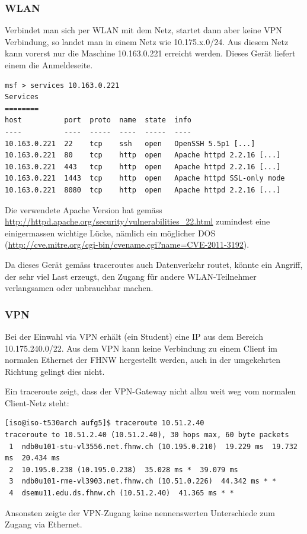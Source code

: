 \documentclass[11pt,a4paper]{scrartcl}
\begin{document}
\subsubsection{WLAN}
Verbindet man sich per WLAN mit dem Netz, startet dann aber keine VPN Verbindung, so landet man in einem Netz wie 10.175.x.0/24. Aus diesem Netz kann vorerst nur die Maschine 10.163.0.221 erreicht werden. Dieses Gerät liefert einem die Anmeldeseite.
\begin{lstlisting}
msf > services 10.163.0.221
Services
========
host          port  proto  name  state  info
----          ----  -----  ----  -----  ----
10.163.0.221  22    tcp    ssh   open   OpenSSH 5.5p1 [...]
10.163.0.221  80    tcp    http  open   Apache httpd 2.2.16 [...]
10.163.0.221  443   tcp    http  open   Apache httpd 2.2.16 [...]
10.163.0.221  1443  tcp    http  open   Apache httpd SSL-only mode 
10.163.0.221  8080  tcp    http  open   Apache httpd 2.2.16 [...]
\end{lstlisting}
Die verwendete Apache Version hat gemäss \url{http://httpd.apache.org/security/vulnerabilities_22.html} zumindest eine einigermassen wichtige Lücke, nämlich ein möglicher DOS (\url{http://cve.mitre.org/cgi-bin/cvename.cgi?name=CVE-2011-3192}).

Da dieses Gerät gemäss traceroutes auch Datenverkehr routet, könnte ein Angriff, der sehr viel Last erzeugt, den Zugang für andere WLAN-Teilnehmer verlangsamen oder unbrauchbar machen.

\subsubsection{VPN}
Bei der Einwahl via VPN erhält (ein Student) eine IP aus dem Bereich 10.175.240.0/22. Aus dem VPN kann keine Verbindung zu einem Client im normalen Ethernet der FHNW hergestellt werden, auch in der umgekehrten Richtung gelingt dies nicht.

Ein traceroute zeigt, dass der VPN-Gateway nicht allzu weit weg vom normalen Client-Netz steht:
\begin{lstlisting}
[iso@iso-t530arch aufg5]$ traceroute 10.51.2.40
traceroute to 10.51.2.40 (10.51.2.40), 30 hops max, 60 byte packets
 1  ndb0u101-stu-vl3556.net.fhnw.ch (10.195.0.210)  19.229 ms  19.732 ms  20.434 ms
 2  10.195.0.238 (10.195.0.238)  35.028 ms *  39.079 ms
 3  ndb0u101-rme-vl3903.net.fhnw.ch (10.51.0.226)  44.342 ms * *
 4  dsemu11.edu.ds.fhnw.ch (10.51.2.40)  41.365 ms * *
\end{lstlisting}
Ansonsten zeigte der VPN-Zugang keine nennenswerten Unterschiede zum Zugang via Ethernet.
\end{document}
